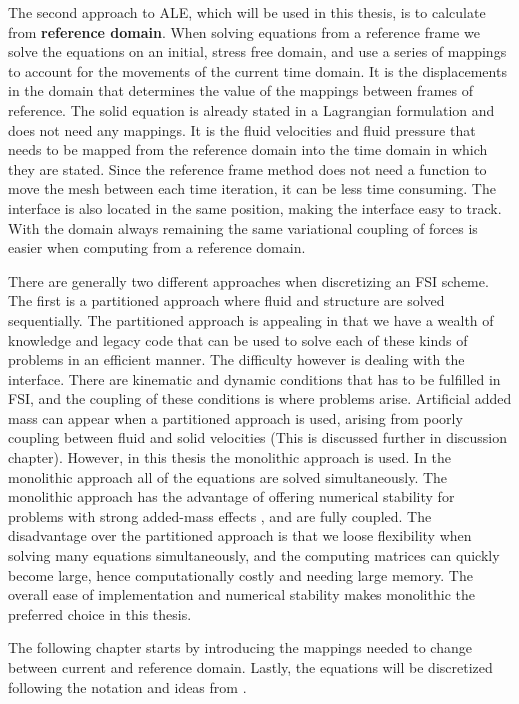 The second approach to ALE, which will be used in this thesis, is to calculate from \textbf{reference domain}.
When solving equations from a reference frame we solve the equations on an initial, stress free domain, and use a series of mappings to account for the movements of the current time domain. It is the displacements in the domain that determines the value of the mappings between frames of reference. The solid equation is already stated in a Lagrangian formulation and does not need any mappings. It is the fluid velocities and fluid pressure that needs to be mapped from the reference domain into the time domain in which they are stated.
Since the reference frame method does not need a function to move the mesh between each time iteration, it can be less time consuming. The interface is also located in the same position, making the interface easy to track. With the domain always remaining the same variational coupling of forces is easier when computing from a reference domain.\newline

There are generally two different approaches when discretizing an FSI scheme. The first is a partitioned approach where fluid and structure are solved sequentially. The partitioned approach is appealing in that we have a wealth of knowledge and legacy code that can be used to solve each of these kinds of problems in an efficient manner. The difficulty however is dealing with the interface. There are kinematic and dynamic conditions that has to be fulfilled in FSI, and the coupling of these conditions is where problems arise. Artificial added mass can appear when a partitioned approach is used, arising from poorly coupling between fluid and solid velocities (This is discussed further in discussion chapter). However, in this thesis the monolithic approach is used. In the monolithic approach all of the equations are solved simultaneously. The monolithic approach has the advantage of offering numerical stability for problems with strong added-mass effects \cite{Liu2014}, and are fully coupled. The disadvantage over the partitioned approach is that we loose flexibility when solving many equations simultaneously, and the computing matrices can quickly become large, hence computationally costly and needing large memory. The overall ease of implementation and numerical stability makes monolithic the preferred choice in this thesis. \newline

The following chapter starts by introducing the mappings needed to change between current and reference domain. Lastly, the equations will be discretized following the notation and ideas from \cite{2010}.

